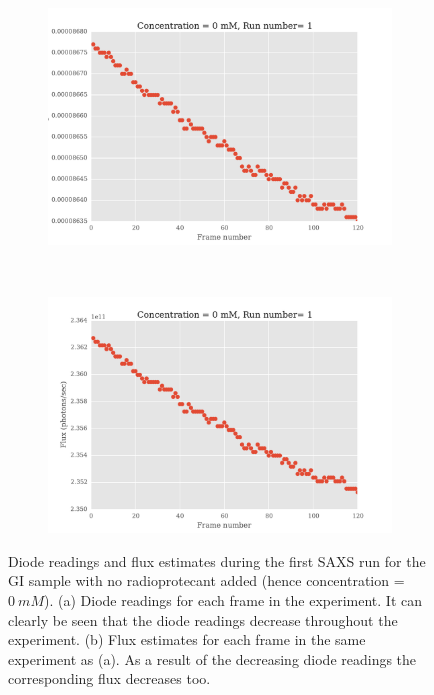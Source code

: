 \begin{figure}
    \centering
    \begin{subfigure}[b]{0.7\textwidth}
            \centering
            \includegraphics[width=\textwidth]{figures/saxs/np_diode_readings.pdf}
            \caption{}
            \label{fig:Diode readings}
    \end{subfigure}
    \\
    \begin{subfigure}[b]{0.7\textwidth}
            \centering
            \includegraphics[width=\textwidth]{figures/saxs/np_flux_estimates.pdf}
            \caption{}
            \label{fig:Flux estimates}
    \end{subfigure}
    \caption{Diode readings and flux estimates during the first SAXS run for the GI sample with no radioprotecant added (hence concentration = $0\ mM$). (a) Diode readings for each frame in the experiment. It can clearly be seen that the diode readings decrease throughout the experiment. (b) Flux estimates for each frame in the same experiment as (a). As a result of the decreasing diode readings the corresponding flux decreases too.}
    \label{fig:Diode and flux readings}
\end{figure}
